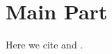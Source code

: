 \documentclass[./mainBiblatex]{subfiles}
\begin{document}
\section{Main Part}
Here we cite \textcite{Mitchell1191} and \textcite{Haxby2425}.

\end{document}
